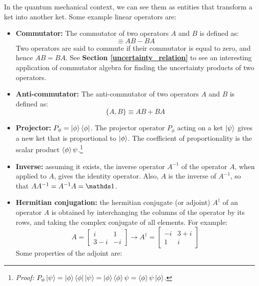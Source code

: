 In the quantum mechanical context, we can see them as entities that transform a ket into another ket. Some example linear operators are:
\begin{itemize}
    \item \textbf{Commutator:} The commutator of two operators $A$ and $B$ is defined as:
    \begin{equation}
        [A, B] \equiv AB - BA
    \end{equation}
    Two operators are said to commute if their commutator is equal to zero, and hence $AB = BA$. See \textbf{Section \ref{uncertainty_relation}} to see an interesting application of commutator algebra for finding the uncertainty products of two operators.
    \item \textbf{Anti-commutator:} The anti-commutator of two operators $A$ and $B$ is defined as:
    \begin{equation}
        \{A, B\} \equiv AB + BA
    \end{equation}
    \item \textbf{Projector:} $P_\phi = \ket{\phi}\bra{\phi}$. The projector operator $P_\phi$ acting on a ket $\ket{\psi}$ gives a new ket that is proportional to $\ket{\phi}$. The coefficient of proportionality is the scalar product $\braket{\phi}{\psi}$.\footnote{\textit{Proof:} $P_\phi\ket{\psi} = \ket{\phi}\bra{\phi}\ket{\psi} = \ket{\phi}\braket{\phi}{\psi} = \braket{\phi}{\psi}\ket{\phi}$.}
    \item \textbf{Inverse:} assuming it exists, the inverse operator $A^{-1}$ of the operator $A$, when applied to $A$, gives the identity operator. Also, $A$ is the inverse of $A^{-1}$, so that $AA^{-1} = A^{-1}A = \Imat$.
    \item \textbf{Hermitian conjugation:} the hermitian conjugate (or adjoint) $A^\dagger$ of an operator $A$ is obtained by interchanging the columns of the operator by its rows, and taking the complex conjugate of all elements. For example:
    \begin{equation}
        A = \begin{bmatrix}
            i & 1 \\
            3-i & -i
        \end{bmatrix}\rightarrow
        A^\dagger = \begin{bmatrix}
            -i & 3 + i \\
            1 & i
        \end{bmatrix}
    \end{equation}
    Some properties of the adjoint are:

\end{itemize}
